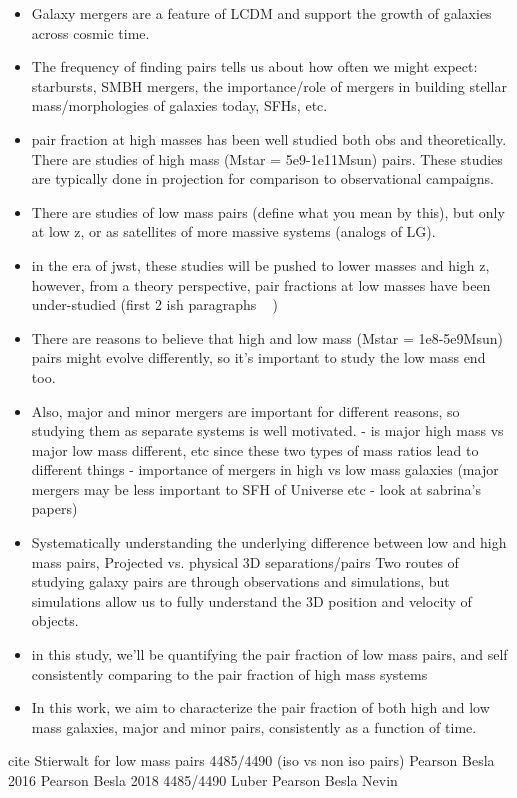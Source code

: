 \documentclass[twocolumn]{aastex631}
\begin{document}
\begin{itemize}
    \item Galaxy mergers are a feature of LCDM and support the growth of galaxies across cosmic time.
    \item The frequency of finding pairs tells us about how often we might expect: starbursts, SMBH mergers, the importance/role of mergers in building stellar mass/morphologies of galaxies today, SFHs, etc. 
    \item pair fraction at high masses has been well studied both obs and theoretically. There are studies of high mass (Mstar = 5e9-1e11Msun) pairs. These studies are typically done in projection for comparison to observational campaigns.
    \item There are studies of low mass pairs (define what you mean by this), but only at low z, or as satellites of more massive systems (analogs of LG). 
    \item in the era of jwst, these studies will be pushed to lower masses and high z, however, from a theory perspective, pair fractions at low masses have been under-studied (first 2 ish paragraphs ~ )
    \item There are reasons to believe that high and low mass (Mstar = 1e8-5e9Msun) pairs might evolve differently, so it's important to study the low mass end too. 

    \item Also, major and minor mergers are important for different reasons, so studying them as separate systems is well motivated.
        - is major high mass vs major low mass different, etc since these two types of mass ratios lead to different things 
        - importance of mergers in high vs low mass galaxies (major mergers may be less important to SFH of Universe etc - look at sabrina's papers)
    \item Systematically understanding the underlying difference between low and high mass pairs, Projected vs. physical 3D separations/pairs Two routes of studying galaxy pairs are through observations and simulations, but simulations allow us to fully understand the 3D position and velocity of objects. 
    \item in this study, we'll be quantifying the pair fraction of low mass pairs, and self consistently comparing to the pair fraction of high mass systems
    \item In this work, we aim to characterize the pair fraction of both high and low mass galaxies, major and minor pairs, consistently as a function of time. 
\end{itemize}
cite Stierwalt for low mass pairs 4485/4490 (iso vs non iso pairs) 
Pearson Besla 2016 
Pearson Besla 2018 4485/4490
Luber Pearson Besla 
Nevin 
\end{document}
